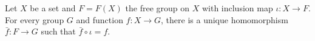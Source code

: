 \begin{theorem}
Let $X$ be a set and $F = F(X)$ the free group on $X$ with inclusion map $\iota: X \rightarrow F$. For every group $G$ and function $f: X \rightarrow G$, there is a unique homomorphism $\bar{f}: F \rightarrow G$ such that $\bar{f} \circ \iota = f$.
\end{theorem}
